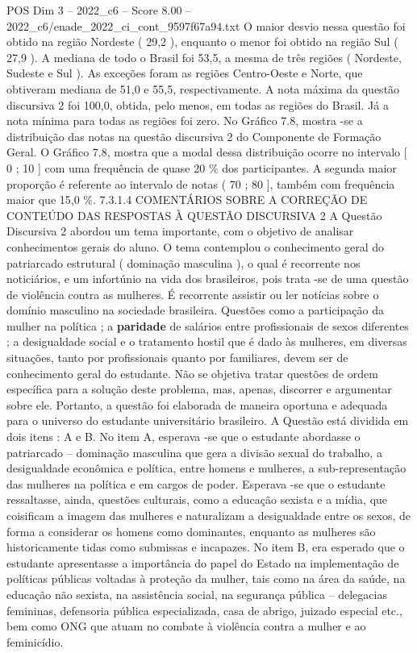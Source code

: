 \begin{textsample}{POS Dim 3 – 2022\_c6 – Score 8.00 – 2022\_c6/enade\_2022\_ci\_cont\_9597f67a94.txt}
O maior desvio nessa questão foi obtido na região Nordeste ( 29,2 ), enquanto o menor foi obtido na região Sul ( 27,9 ).
A mediana de todo o Brasil foi 53,5, a mesma de três regiões ( Nordeste, Sudeste e Sul ).
As exceções foram as regiões Centro-Oeste e Norte, que obtiveram mediana de 51,0 e 55,5, respectivamente.
A nota máxima da questão discursiva 2 foi 100,0, obtida, pelo menos, em todas as regiões do Brasil.
Já a nota mínima para todas as regiões foi zero.
No Gráfico 7.8, mostra -se a distribuição das notas na questão discursiva 2 do Componente de Formação Geral.
O Gráfico 7.8, mostra que a modal dessa distribuição ocorre no intervalo [ 0 ; 10 ] com uma frequência de quase 20 \% dos participantes.
A segunda maior proporção é referente ao intervalo de notas ( 70 ; 80 ], também com frequência maior que 15,0 \%. 7.3.1.4 COMENTÁRIOS SOBRE A CORREÇÃO DE CONTEÚDO DAS RESPOSTAS À QUESTÃO DISCURSIVA 2 A Questão Discursiva 2 abordou um tema importante, com o objetivo de analisar conhecimentos gerais do aluno.
O tema contemplou o conhecimento geral do patriarcado estrutural ( dominação masculina ), o qual é recorrente nos noticiários, e um infortúnio na vida dos brasileiros, pois trata -se de uma questão de violência contra as mulheres.
É recorrente assistir ou ler notícias sobre o domínio masculino na sociedade brasileira.
Questões como a participação da mulher na política ; a \textbf{paridade} de salários entre profissionais de sexos diferentes ; a desigualdade social e o tratamento hostil que é dado às mulheres, em diversas situações, tanto por profissionais quanto por familiares, devem ser de conhecimento geral do estudante.
Não se objetiva tratar questões de ordem específica para a solução deste problema, mas, apenas, discorrer e argumentar sobre ele.
Portanto, a questão foi elaborada de maneira oportuna e adequada para o universo do estudante universitário brasileiro.
A Questão está dividida em dois itens : A e B.
No item A, esperava -se que o estudante abordasse o patriarcado – dominação masculina que gera a divisão sexual do trabalho, a desigualdade econômica e política, entre homens e mulheres, a sub-representação das mulheres na política e em cargos de poder.
Esperava -se que o estudante ressaltasse, ainda, questões culturais, como a educação sexista e a mídia, que coisificam a imagem das mulheres e naturalizam a desigualdade entre os sexos, de forma a considerar os homens como dominantes, enquanto as mulheres são historicamente tidas como submissas e incapazes.
No item B, era esperado que o estudante apresentasse a importância do papel do Estado na implementação de políticas públicas voltadas à proteção da mulher, tais como na área da saúde, na educação não sexista, na assistência social, na segurança pública – delegacias femininas, defensoria pública especializada, casa de abrigo, juizado especial etc., bem como ONG que atuam no combate à violência contra a mulher e ao feminicídio.

\end{textsample}
